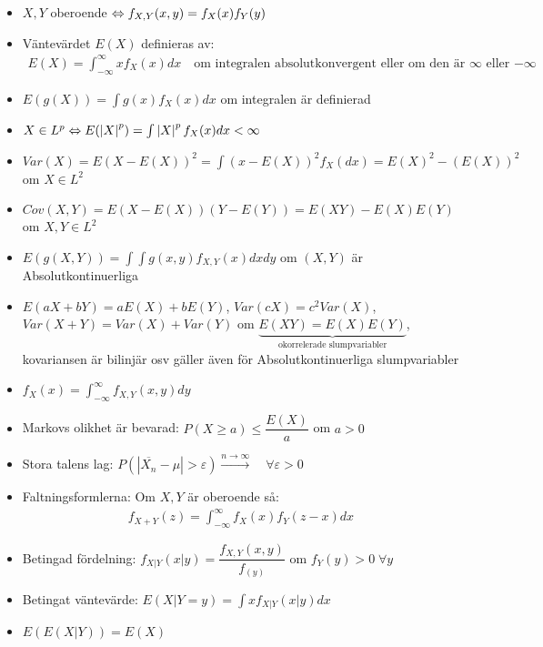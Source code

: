 \begin{itemize}
  \item $X,Y$ oberoende $\Leftrightarrow f_{X,Y}(x,y)= f_X(x)f_Y(y)$ 
  \item Väntevärdet $E(X)$ definieras av:
    \begin{equation*}
      \begin{gathered}
        E(X) = \int_{-\infty}^{\infty}xf_X(x)dx\quad\text{om integralen absolutkonvergent eller om den är $\infty$ eller $-\infty$}
      \end{gathered}
    \end{equation*}
  \item $E(g(X)) = \int g(x)f_X(x)dx$ om integralen är definierad
  \item $X\in L^p\Leftrightarrow E(\left|X\right|^p) = \int\left|X\right|^pf_X(x)dx<\infty$
  \item $Var(X) = E(X-E(X))^2 = \int(x-E(X))^2f_X(dx) = E(X)^2-(E(X))^2$ om $X\in L^2$
  \item $Cov(X,Y) = E(X-E(X))(Y-E(Y)) = E(XY)-E(X)E(Y)$ om $X,Y\in L^2$
  \item $E(g(X,Y)) = \int\int g(x,y)f_{X,Y}(x)dxdy$ om $(X,Y)$ är Absolutkontinuerliga
  \item $E(aX+bY) = aE(X)+bE(Y)$, $Var(cX) = c^2Var(X)$, $Var(X+Y) = Var(X)+Var(Y)$ om $\underbrace{E(XY) = E(X)E(Y)}_{\text{okorrelerade slumpvariabler}}$, kovariansen är bilinjär osv gäller även för Absolutkontinuerliga slumpvariabler
  \item $f_X(x) = \int_{-\infty}^{\infty} f_{X,Y}(x,y)dy$ 
  \item Markovs olikhet är bevarad: $P(X\geq a)\leq \dfrac{E(X)}{a}$ om $a>0$
  \item Stora talens lag: $P(\left|\overline{X_n}-\mu\right|>\varepsilon)\stackrel{n\to\infty}{\to}\quad\forall\varepsilon>0$
  \item Faltningsformlerna: Om $X,Y$ är oberoende så:
    \begin{equation*}
      \begin{gathered}
        f_{X+Y}(z) = \int_{-\infty}^{\infty}f_X(x)f_Y(z-x)dx
      \end{gathered}
    \end{equation*}
  \item Betingad fördelning: $f_{X|Y}(x|y) = \dfrac{f_{X,Y}(x,y)}{f_(y)}$ om $f_Y(y)>0\;\forall y$
  \item Betingat väntevärde: $E(X|Y = y) = \int xf_{X|Y}(x|y)dx$
  \item $E(E(X|Y)) = E(X)$
\end{itemize}
